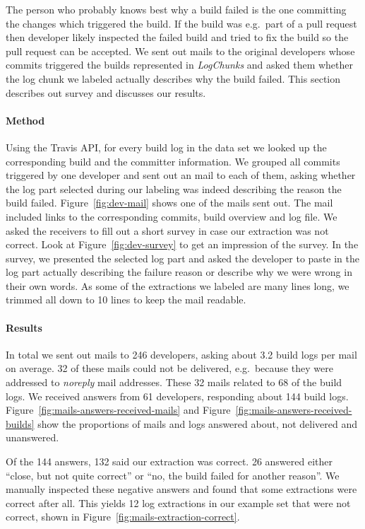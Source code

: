 \documentclass[\myrootdir/main.tex]{subfiles}
\begin{document}
The person who probably knows best why a build failed is the one committing the changes which triggered the build.
If the build was e.g.\ part of a pull request then developer likely inspected the failed build and tried to fix the build so the pull request can be accepted.
We sent out mails to the original developers whose commits triggered the builds represented in \emph{LogChunks} and asked them whether the log chunk we labeled actually describes why the build failed.
This section describes out survey and discusses our results.

\paragraph{Method}
Using the Travis API, for every build log in the data set we looked up the corresponding build and the committer information.
We grouped all commits triggered by one developer and sent out an mail to each of them, asking whether the log part selected during our labeling was indeed describing the reason the build failed.
Figure~\ref{fig:dev-mail} shows one of the mails sent out.
The mail included links to the corresponding commits, build overview and log file.
We asked the receivers to fill out a short survey in case our extraction was not correct.
Look at Figure~\ref{fig:dev-survey} to get an impression of the survey.
In the survey, we presented the selected log part and asked the developer to paste in the log part actually describing the failure reason or describe why we were wrong in their own words.
As some of the extractions we labeled are many lines long, we trimmed all down to 10 lines to keep the mail readable.

\paragraph{Results}
In total we sent out mails to 246 developers, asking about 3.2 build logs per mail on average.
32 of these mails could not be delivered, e.g.\ because they were addressed to \emph{noreply} mail addresses.
These 32 mails related to 68 of the build logs.
We received answers from 61 developers, responding about 144 build logs.
Figure~\ref{fig:mails-answers-received-mails} and Figure~\ref{fig:mails-answers-received-builds} show the proportions of mails and logs answered about, not delivered and unanswered.

Of the 144 answers, 132 said our extraction was correct.
26 answered either ``close, but not quite correct'' or ``no, the build failed for another reason''.
We manually inspected these negative answers and found that some extractions were correct after all.
This yields 12 log extractions in our example set that were not correct, shown in Figure~\ref{fig:mails-extraction-correct}.
\end{document}
